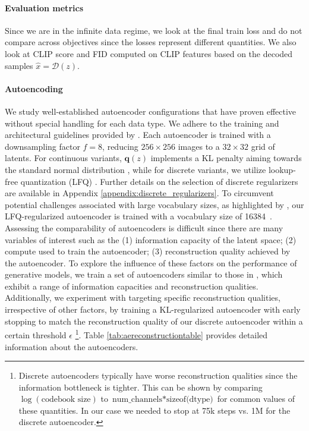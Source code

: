 \paragraph{Evaluation metrics}
\label{sec:experimentalsetup:eval}
Since we are in the infinite data regime, we look at the final train loss and do not compare across objectives since the losses represent different quantities. We also look at CLIP score \citep{radford2021learning, hessel2022clipscore} and FID computed on CLIP features \citep{sauer2021projected} based on the decoded samples $\hat{x} = \mathcal{D}(z)$.

\paragraph{Autoencoding}
\label{experimentalsetup:autoencoding}
We study well-established autoencoder configurations that have proven effective without special handling for each data type. We adhere to the training and architectural guidelines provided by \cite{rombach2022highresolution}. Each autoencoder is trained with a downsampling factor \(f=8\), reducing \(256 \times 256\) images to a \(32 \times 32\) grid of latents. For continuous variants, \(\textbf{q}(z)\) implements a KL penalty aiming towards the standard normal distribution \citep{kingma2022autoencoding, rombach2022highresolution}, while for discrete variants, we utilize lookup-free quantization (LFQ) \citep{yu2024language}. Further details on the selection of discrete regularizers are available in Appendix \ref{appendix:discrete_regularizers}. To circumvent potential challenges associated with large vocabulary sizes, as highlighted by \cite{yu2024language}, our LFQ-regularized autoencoder is trained with a vocabulary size of 16384~\citep{esser2021taming}. Assessing the comparability of autoencoders is difficult since there are many variables of interest such as the (1) information capacity of the latent space; (2) compute used to train the autoencoder; (3) reconstruction quality achieved by the autoencoder. To explore the influence of these factors on the performance of generative models, we train a set of autoencoders similar to those in \cite{esser2024scaling}, which exhibit a range of information capacities and reconstruction qualities. Additionally, we experiment with targeting specific reconstruction qualities, irrespective of other factors, by training a KL-regularized autoencoder with early stopping to match the reconstruction quality of our discrete autoencoder within a certain threshold \(\epsilon\) \footnote{Discrete autoencoders typically have worse reconstruction qualities since the information bottleneck is tighter. This can be shown by comparing $\log(\text{codebook size})$ to $\text{num\_channels} * \text{sizeof(dtype)}$ for common values of these quantities. In our case we needed to stop at 75k steps vs. 1M for the discrete autoencoder.}. Table \ref{tab:aereconstructiontable} provides detailed information about the autoencoders.

